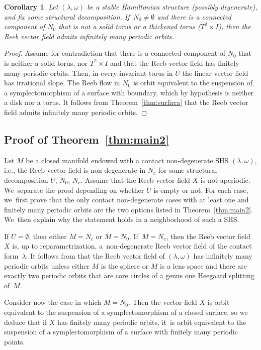 \documentclass[11pt]{article}
\newcommand{\ie}{i.e.,\xspace}
\newtheorem{Corollary}[theorem]{Corollary}
\theoremstyle{definition}
\begin{document}
\begin{Corollary}
Let $(\lambda, \omega)$ be a stable Hamiltonian structure ({possibly} degenerate), and fix some structural decomposition. If~$N_0\neq \emptyset$ and there is a connected component of $N_0$ that is not a solid torus or a thickened torus ($T^2\times I$), then the Reeb vector field admits infinitely many periodic orbits.
\end{Corollary}

\begin{proof}
Assume for contradiction that there is a connected component of $N_0$ that is neither a solid torus, nor $T^2\times I$ and that the Reeb vector field has finitely many periodic orbits. Then, in every invariant torus in $U$ the linear vector field has irrational slope. The Reeb flow in $N_0$ is orbit equivalent to the suspension of a symplectomorphism of a surface with boundary, which by hypothesis is neither a disk nor a torus. It follows from Theorem~\ref{thm:surfirra} that the Reeb vector field admits infinitely many periodic orbits.
\end{proof}

\subsection{Proof of Theorem~\ref{thm:main2}}

Let $M$ be a closed manifold endowed with a contact non-degenerate SHS $(\lambda,\omega)$, \ie the Reeb vector field is non-degenerate in $N_c$ for some structural decomposition $U$, $N_0$, $N_c$. Assume that the Reeb vector field $X$ is not aperiodic. We~separate the proof depending on whether $U$ is empty or not. For each case, we~first prove that the only contact non-degenerate cases with at least one and finitely many periodic orbits are the two options listed in Theorem~\ref{thm:main2}. We~then explain why
the statement holds in a neighborhood of such a SHS.

{If $U\!=\!\emptyset$, then either $M\!=\!N_c$ or $M\!=\!N_0$. If~$M\!=\!N_c$,} then the Reeb vector field~$X$ is, up to reparametrization, a~non-degenerate Reeb vector field of the contact form~$\lambda$.
It follows from \cite[Th.\,1.2]{CDR} that the Reeb vector field of $(\lambda, \omega)$ has infinitely many periodic orbits unless either $M$ is the sphere or $M$ is a lens space and there are exactly two periodic orbits that are core circles of a genus one Heegaard splitting of~$M$.

Consider now the case in which $M=N_0$. Then the vector field $X$ is orbit equivalent to the suspension of a symplectomorphism of a closed surface, so we deduce that if $X$ has finitely many periodic orbits, it~is orbit equivalent to the suspension of a symplectomorphism of a surface with finitely many periodic points.
\end{document}
